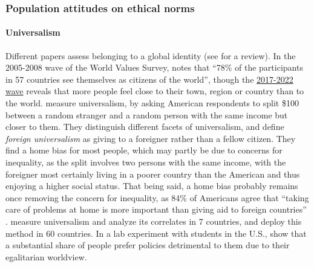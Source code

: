 
\subsubsection{Population attitudes on ethical norms}\label{subsubsec:literature_wealth_tax}

\paragraph{Universalism}
Different papers assess belonging to a global identity (see %
\citet{reysen_psychology_2018} for a review). In the 2005-2008 wave of the World Values Survey, \citet{bayram_what_2015} notes that ``78\% of the participants in 57 countries see themselves as citizens of the world'', though the \href{https://www.worldvaluessurvey.org/WVSDocumentationWV7.jsp}{2017-2022 wave} reveals that more people feel close to their town, region or country than to the world. 
\citet{enke_moral_2023-1} measure universalism, by asking American respondents to split \$100 between a random stranger and a random person with the same income but closer to them. They distinguish different facets of universalism, and define \textit{foreign universalism} as giving to a foreigner rather than a fellow citizen. They find a home bias for most people, which may partly be due to concerns for inequality, as the split involves two persons with the same income, with the foreigner most certainly living in a poorer country than the American and thus enjoying a higher social status. 
That being said, a home bias probably remains once removing the concern for inequality, as 84\% of Americans agree that ``taking care of problems at home is more important than giving aid to foreign countries'' \citep{pipa_americans_2001}. 
\citet{enke_moral_2023} measure universalism and analyze its correlates in 7 countries, and \citet{cappelen_universalism_2022} deploy this method in 60 countries. 
In a lab experiment with students in the U.S., \citet{cherry_accepting_2017} show that a substantial share of people prefer policies detrimental to them due to their egalitarian worldview. 

